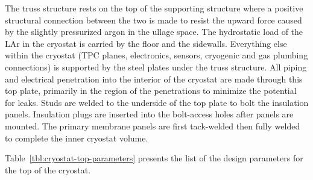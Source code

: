 The truss structure rests on the top of the supporting structure where a positive structural connection 
between the two is made to resist the upward force caused by the slightly pressurized argon in the ullage 
space. The hydrostatic load of the LAr in the cryostat is carried by the floor and the sidewalls. Everything else within the cryostat (TPC planes, electronics, sensors, cryogenic and gas plumbing connections) is 
supported by the steel plates under the truss structure. All piping and electrical penetration into the 
interior of the cryostat are made through this top plate, primarily in the region of the penetrations to 
minimize the potential for leaks. Studs are welded to the underside of the top plate to bolt the insulation 
panels. Insulation plugs are inserted into the bolt-access holes after panels are mounted. The primary 
membrane panels are first tack-welded then fully welded to complete the inner cryostat volume.


Table~\ref{tbl:cryostat-top-parameters} presents the list of the design parameters for the top of the cryostat.

